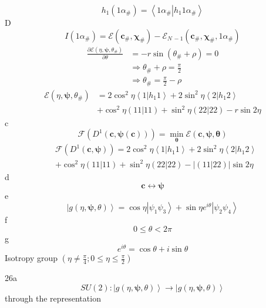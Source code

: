 \documentclass[aps,preprint]{revtex4}%
\begin{document}
\[
h_{1}\left(  1\alpha_{\#}\right)  =\left\langle \left.  1\alpha_{\#}%
\right\vert h_{1}1\alpha_{\#}\right\rangle
\]
D%
\[
I\left(  1\alpha_{\#}\right)  =\mathcal{E}\left(  \mathbf{c}_{\#}%
,\mathbf{\chi}_{\#}\right)  -\mathcal{E}_{N\,-1}\left(  \mathbf{c}%
_{\#},\mathbf{\chi}_{\#}\mathbf{,}1\alpha_{\#}\right)
\]%
\begin{align*}
\frac{\partial\mathcal{E}\left(  \eta,\mathbf{\psi,}\theta_{\#}\right)
}{\partial\theta}  &  =-r\sin\left(  \theta_{\#}+\rho\right)  =0\\
&  \Rightarrow\theta_{\#}+\rho=\frac{\pi}{2}\\
&  \Rightarrow\theta_{\#}=\frac{\pi}{2}-\rho
\end{align*}%
\begin{align*}
\mathcal{E}\left(  \eta,\mathbf{\psi,}\theta_{\#}\right)   &  =2\cos^{2}%
\eta\left\langle 1\left\vert h_{1}1\right.  \right\rangle +2\sin^{2}%
\eta\left\langle 2\left\vert h_{1}2\right.  \right\rangle \\
&  +\cos^{2}\eta\left(  \left.  11\right\vert 11\right)  +\sin^{2}\eta\left(
\left.  22\right\vert 22\right)  -r\sin2\eta
\end{align*}
c%
\[
\mathcal{F}\left(  D^{1}\left(  \mathbf{c,\psi}\left(  \mathbf{c}\right)
\right)  \right)  =\min_{\mathbf{\theta}}\mathcal{E}\left(  \mathbf{c,\psi
,\theta}\right)
\]%
\begin{align*}
&  \mathcal{F}\left(  D^{1}\left(  \mathbf{c,\psi}\right)  \right)  =2\cos
^{2}\eta\left\langle 1\left\vert h_{1}1\right.  \right\rangle +2\sin^{2}%
\eta\left\langle 2\left\vert h_{1}2\right.  \right\rangle \\
&  +\cos^{2}\eta\left(  \left.  11\right\vert 11\right)  +\sin^{2}\eta\left(
\left.  22\right\vert 22\right)  -\left\vert \left(  \left.  11\right\vert
22\right)  \right\vert \sin2\eta
\end{align*}
d%
\[
\mathbf{c\longleftrightarrow\psi}%
\]
e%
\begin{equation}
\left\vert g\left(  \eta\mathbf{,\psi,}\theta\right)  \right\rangle =\cos
\eta\left\vert \psi_{1}\psi_{3}\right\rangle +\sin\eta e^{i\theta}\left\vert
\psi_{2}\psi_{4}\right\rangle \nonumber
\end{equation}
f%
\[
0\leq\theta<2\pi
\]
g%
\[
e^{i\theta}=\cos\theta+i\sin\theta
\]
Isotropy group $\left(  \eta\neq\frac{\pi}{4};0\leq\eta\leq\frac{\pi}%
{2}\right)  $

26a%
\[
SU\left(  2\right)  :\left\vert g\left(  \eta\mathbf{,\psi,}\theta\right)
\right\rangle \rightarrow\left\vert g\left(  \eta\mathbf{,\psi,}\theta\right)
\right\rangle
\]
through the representation
\end{document}

